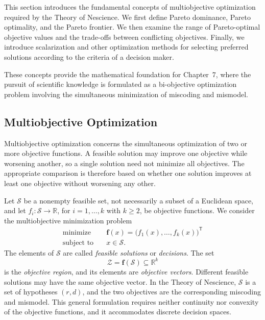 This section introduces the fundamental concepts of multiobjective optimization required by the Theory of Nescience. We first define Pareto dominance, Pareto optimality, and the Pareto frontier. We then examine the range of Pareto-optimal objective values and the trade-offs between conflicting objectives. Finally, we introduce scalarization and other optimization methods for selecting preferred solutions according to the criteria of a decision maker.

These concepts provide the mathematical foundation for Chapter~7, where the pursuit of scientific knowledge is formulated as a bi-objective optimization problem involving the simultaneous minimization of miscoding and mismodel.


\subsection*{Multiobjective Optimization}
\label{sec:multiobjective_optimization}

Multiobjective optimization concerns the simultaneous optimization of two or more objective functions. A feasible solution may improve one objective while worsening another, so a single solution need not minimize all objectives. The appropriate comparison is therefore based on whether one solution improves at least one objective without worsening any other.

Let $\mathcal{S}$ be a nonempty feasible set, not necessarily a subset of a Euclidean space, and let $f_i:\mathcal{S}\to\mathbb{R}$, for $i=1,\ldots,k$ with $k\geq2$, be objective functions. We consider the multiobjective minimization problem
\[
\begin{aligned}
\text{minimize}\quad & \mathbf{f}(x)=\bigl(f_1(x),\ldots,f_k(x)\bigr)^{\mathsf T}\\
\text{subject to}\quad & x\in\mathcal{S}.
\end{aligned}
\]
The elements of $\mathcal{S}$ are called \emph{feasible solutions} or \emph{decisions}. The set
\[
\mathcal{Z}=\mathbf{f}(\mathcal{S})\subseteq\mathbb{R}^k
\]
is the \emph{objective region}, and its elements are \emph{objective vectors}. Different feasible solutions may have the same objective vector. In the Theory of Nescience, $\mathcal{S}$ is a set of hypotheses $(r,d)$, and the two objectives are the corresponding miscoding and mismodel. This general formulation requires neither continuity nor convexity of the objective functions, and it accommodates discrete decision spaces.

